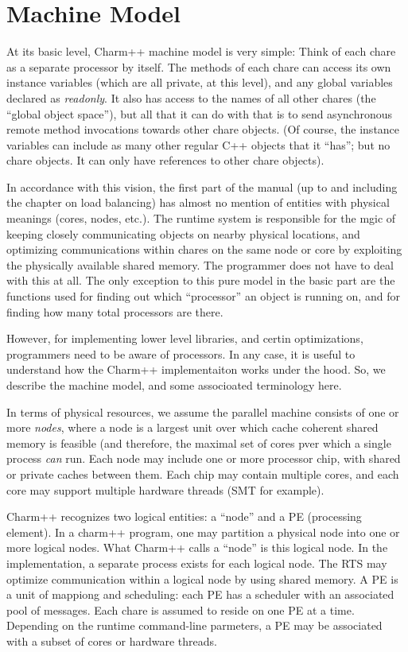 \section{Machine Model}
At its basic level, Charm++ machine model is very simple: Think of
each chare as a separate processor by itself. The methods of each
chare can access its own instance variables (which are all private, at
this level), and any global variables declared as {\em readonly}. It
also has access to the names of all other chares (the ``global object
space''), but all that it can do with that is to send asynchronous
remote method invocations towards other chare objects. (Of course, the
instance variables can include as many other regular C++ objects that
it ``has''; but no chare objects. It can only have references to other
chare objects).

In accordance with this vision, the first part of the manual (up to
and including the chapter on load balancing) has almost no mention of
entities with physical meanings (cores, nodes, etc.). The runtime
system is responsible for the mgic of keeping closely communicating
objects on nearby physical locations, and optimizing communications
within chares on the same node or core by exploiting the physically
available shared memory. The programmer does not have to deal with
this at all. The only exception to this pure model in the basic part
are the functions used for finding out which ``processor'' an object
is running on, and for finding how many total processors are there.

However, for implementing lower level libraries, and certin optimizations,
programmers need to be aware of processors. In any case, it is useful
to understand how the Charm++ implementaiton works under the hood. So,
we describe the machine model, and some associoated terminology here.

In terms of physical resources, we assume the parallel machine
consists of one or more {\em nodes}, where a node is a largest unit
over which cache coherent shared memory is feasible (and therefore,
the maximal set of cores pver which a single process {\em can} run.
Each node may include one or more processor chip, with shared or
private caches between them. Each chip may contain multiple cores, and
each core may support multiple hardware threads (SMT for example).

Charm++ recognizes two logical entities: a ``node'' and a PE
(processing element).  In a charm++ program, one may partition a
physical node into one or more logical nodes. What Charm++ calls a
``node'' is this logical node. In the implementation, a separate
process exists for each logical node. The RTS may optimize
communication within a logical node by using shared memory. A PE is a
unit of mappiong and scheduling: each PE has a scheduler with an
associated pool of messages. Each chare is assumed to reside on one PE
at a time. Depending on the runtime command-line parmeters, a PE may
be associated with a subset of cores or hardware threads. 

